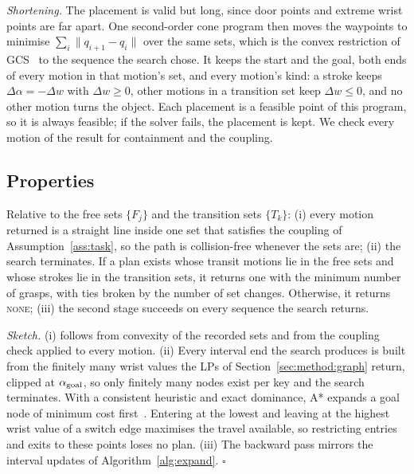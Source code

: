 \emph{Shortening.} The placement is valid but long, since door points and
extreme wrist points are far apart. One second-order cone program then moves
the waypoints to minimise $\sum_i\|q_{i+1}-q_i\|$ over the same sets, which is
the convex restriction of GCS~\cite{marcucci2023motion} to the sequence the
search chose. It keeps the start and the goal, both ends of every motion in
that motion's set, and every motion's kind: a stroke keeps
$\Delta\alpha=-\Delta w$ with $\Delta w\ge0$, other motions in a transition set
keep $\Delta w\le0$, and no other motion turns the object. Each placement is a
feasible point of this program, so it is always feasible; if the solver fails,
the placement is kept. We check every motion of the result for containment and
the coupling.

\subsection{Properties}
\label{sec:method:properties}
\begin{proposition}[informal]
\label{prop:guarantees}
Relative to the free sets $\{F_j\}$ and the transition sets $\{T_k\}$:
(i) every motion returned is a straight line inside one set that satisfies
the coupling of Assumption~\ref{ass:task}, so the path is collision-free
whenever the sets are;
(ii) the search terminates. If a plan exists whose transit motions lie in the
free sets and whose strokes lie in the transition sets, it returns one with
the minimum number of grasps, with ties broken by the number of set changes.
Otherwise, it returns \textsc{none};
(iii) the second stage succeeds on every sequence the search returns.
\end{proposition}
\noindent\emph{Sketch.} (i) follows from convexity of the recorded sets and
from the coupling check applied to every motion.
(ii) Every interval end the search produces is built from the finitely many
wrist values the LPs of Section~\ref{sec:method:graph} return, clipped at
$\alpha_{\mathrm{goal}}$, so only finitely many nodes exist per key and the search
terminates. With a
consistent heuristic and exact dominance, A* expands a goal node of minimum
cost first~\cite{hart1968astar}. Entering at the lowest and leaving at the highest wrist value of a switch edge
maximises the travel available, so restricting entries and exits to these
points loses no plan. 
(iii) The backward pass mirrors the interval updates of
Algorithm~\ref{alg:expand}. 
\hfill$\square$


